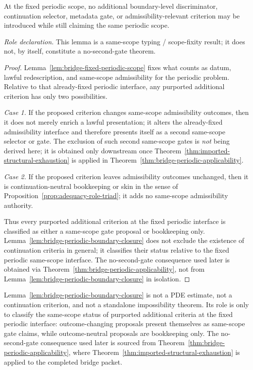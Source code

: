 \begin{manuallemma}
\label{lem:bridge-periodic-boundary-closure}
At the fixed periodic scope, no additional boundary-level discriminator, continuation selector, metadata gate, or admissibility-relevant criterion may be introduced while still claiming the same periodic scope.

\smallskip
\noindent\emph{Role declaration.} This lemma is a same-scope typing / scope-fixity result; it does not, by itself, constitute a no-second-gate theorem.
\end{manuallemma}

\begin{proof}
Lemma~\ref{lem:bridge-fixed-periodic-scope} fixes what counts as datum, lawful redescription, and same-scope admissibility for the periodic problem. Relative to that already-fixed periodic interface, any purported additional criterion has only two possibilities.

\noindent\emph{Case 1.} If the proposed criterion changes same-scope admissibility outcomes, then it does not merely enrich a lawful presentation; it alters the already-fixed admissibility interface and therefore presents itself as a second same-scope selector or gate. The exclusion of such second same-scope gates is \emph{not} being derived here; it is obtained only downstream once Theorem~\ref{thm:imported-structural-exhaustion} is applied in Theorem~\ref{thm:bridge-periodic-applicability}.

\noindent\emph{Case 2.} If the proposed criterion leaves admissibility outcomes unchanged, then it is continuation-neutral bookkeeping or skin in the sense of Proposition~\ref{prop:adequacy-role-triad}; it adds no same-scope admissibility authority.

Thus every purported additional criterion at the fixed periodic interface is classified as either a same-scope gate proposal or bookkeeping only. Lemma~\ref{lem:bridge-periodic-boundary-closure} does not exclude the existence of continuation criteria in general; it classifies their status relative to the fixed periodic same-scope interface. The no-second-gate consequence used later is obtained via Theorem~\ref{thm:bridge-periodic-applicability}, not from Lemma~\ref{lem:bridge-periodic-boundary-closure} in isolation.
\end{proof}

\begin{tcolorbox}[title={What 12F is not}, colback=blue!2!white, colframe=blue!55!black]
Lemma~\ref{lem:bridge-periodic-boundary-closure} is not a PDE estimate, not a continuation criterion, and not a standalone impossibility theorem. Its role is only to classify the same-scope status of purported additional criteria at the fixed periodic interface: outcome-changing proposals present themselves as same-scope gate claims, while outcome-neutral proposals are bookkeeping only. The no-second-gate consequence used later is sourced from Theorem~\ref{thm:bridge-periodic-applicability}, where Theorem~\ref{thm:imported-structural-exhaustion} is applied to the completed bridge packet.
\end{tcolorbox}

